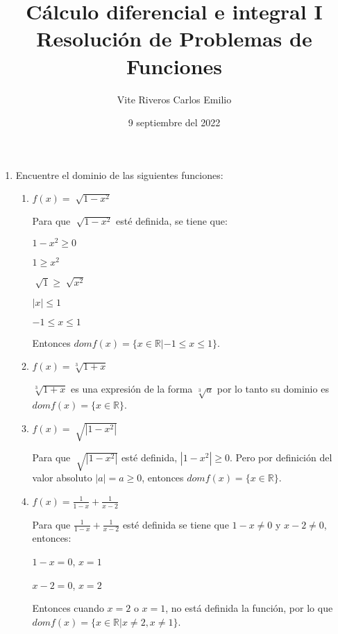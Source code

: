 \documentclass[11pt, a4paper]{article}
\title{Cálculo diferencial e integral I\\Resolución de Problemas de Funciones}
\author{Vite Riveros Carlos Emilio}
\date{9 septiembre del 2022}
\begin{document}
    \maketitle
    \begin{enumerate}
        \item Encuentre el dominio de las siguientes funciones:
        
        \begin{enumerate}
            \item $f(x)=\sqrt[]{1-x^2}$
            
            Para que $\sqrt[]{1-x^2}$ esté definida, se tiene que:
            \begin{center}
                $1-x^2\geq 0$

                $1\geq x^2$

                $\sqrt[]{1}\geq \sqrt[]{x^2}$

                $|x|\leq 1$

                $-1 \leq x \leq 1$

            \end{center}
            Entonces $dom f(x) = \{x \in \mathbb{R} | -1 \leq x \leq 1\}$.
            \item $f(x)=\sqrt[3]{1+x}$
            
            $\sqrt[3]{1+x}$ es una expresión de la forma $\sqrt[3]{a}$ por lo tanto su 
            dominio es $dom f(x)= \{x \in \mathbb{R}\}$.

            \item $f(x)=\sqrt[]{|1-x^2|}$
            
            Para que $\sqrt[]{|1-x^2|}$ esté definida, $|1-x^2| \geq 0$. Pero por definición
            del valor absoluto $|a|=a \geq 0$, entonces $dom f(x) = \{ x \in \mathbb{R}\}$.

            \item $f(x)=\frac{1}{1-x}+\frac{1}{x-2}$
            
            Para que $\frac{1}{1-x}+\frac{1}{x-2}$ esté definida se tiene que $1-x \neq 0$ y $x-2 \neq 0$, 
            entonces:
            \begin{center}
                $1-x = 0$, $x = 1$

                $x-2 = 0$, $x = 2$
            \end{center}

            Entonces cuando $x = 2$ o $x = 1$, no está definida la función, por lo que 
            $dom f(x)= \{x \in \mathbb{R} | x \neq 2, x \neq 1\}$.


\end{enumerate}
\end{enumerate}
\end{document}
